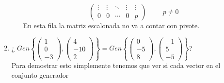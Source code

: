 \documentclass{article}
\begin{document}
\begin{enumerate}
\begin{enumerate}[label=\listAlph]
                \[
                    \left(
                    \begin{array}{cccc|c}
                        \vdots & \vdots & \ddots & \vdots & \vdots \\
                        0 & 0 & \cdots & 0 & p
                    \end{array}
                    \right)
                    \hspace{1cm}
                    p \neq 0
                \]
                En esta fila la matriz escalonada no va a contar con pivote.
        \end{enumerate}
    \item ¿%
        \(
            Gen
            \left\{
                \begin{pmatrix}
                    1 \\ 0 \\ -3
                \end{pmatrix},
                \begin{pmatrix}
                    4 \\ -10 \\ 2
                \end{pmatrix}
            \right\}
            =
            Gen
            \left\{
                \begin{pmatrix}
                    0 \\ -5 \\ 8
                \end{pmatrix},
                \begin{pmatrix}
                    -1 \\ 5 \\ -5
                \end{pmatrix}
            \right\}
        \)? \\
        Para demostrar esto simplemente tenemos que ver si cada vector en el conjunto generador 

\end{enumerate}
\end{document}
